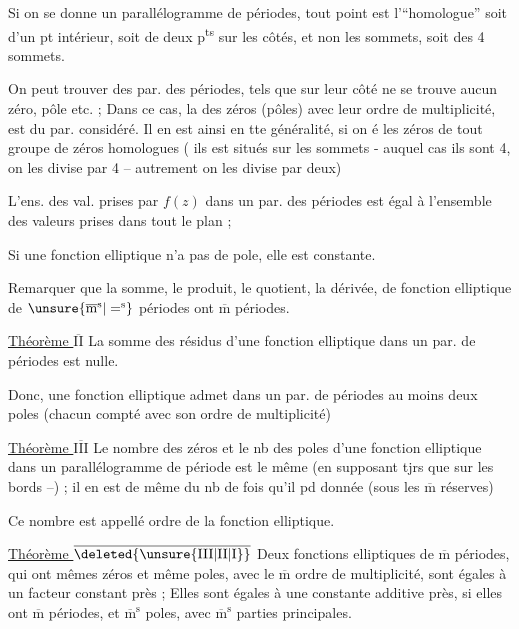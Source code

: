 Si on se donne un parallélogramme de périodes, tout point est l'``homologue'' soit d'un pt intérieur, soit de deux p\textsuperscript{ts} sur les côtés, et non les sommets, soit des 4 sommets.  

On peut trouver des par. des périodes, tels que sur leur côté ne se trouve aucun zéro, pôle etc. ; Dans ce cas, la   des zéros (pôles) avec leur ordre de multiplicité, est  du par. considéré. Il en est ainsi en tte généralité, si on   é les zéros de tout groupe de zéros homologues ( ils est situés sur les sommets - auquel cas ils sont 4, on les divise par 4 -- autrement on les divise par deux)

L'ens. des val. prises par $f(z)$ dans un par. des périodes est égal à l'ensemble des valeurs prises dans tout le plan ;

\margin{$\times$}Si une fonction elliptique n'a pas de pole, elle est constante.

Remarquer que la somme, le produit, le quotient, la dérivée, de fonction elliptique de $\unsure{\overline{\mathrm m}^{\mathrm s}|=^{\mathrm s}}$ périodes ont $\overline{\mathrm m}$ périodes.

\margin{$\uparrow$}\uline{Théorème $\overline{\mathrm{II}}$} La somme des résidus d'une fonction elliptique dans un par. de périodes est nulle.

Donc, une fonction elliptique admet dans un par. de périodes au moins deux poles (chacun compté avec son ordre de multiplicité)

\uline{Théorème $\overline{\mathrm{III}}$} Le nombre des zéros et le nb des poles d'une fonction elliptique dans un parallélogramme de période est le même (en supposant tjrs que sur les bords --) ; il en est de même du nb de fois qu'il pd   donnée (sous les $\overline{\mathrm m}$ réserves)

Ce nombre est appellé ordre de la fonction elliptique.

\margin{$\downarrow$}\uline{Théorème $\overline{\deleted{\unsure{\mathrm{III}|\mathrm{II}|\mathrm I}}}$} Deux fonctions elliptiques de $\overline{\mathrm m}$ périodes, qui ont mêmes zéros et même poles, avec le $\overline{\mathrm m}$ ordre de multiplicité, sont égales à un facteur constant près ; Elles sont égales à une constante additive près, si elles ont $\overline{\mathrm m}$ périodes, et $\overline{\mathrm m}^{\mathrm s}$ poles, avec $\overline{\mathrm m}^{\mathrm s}$ parties principales.

